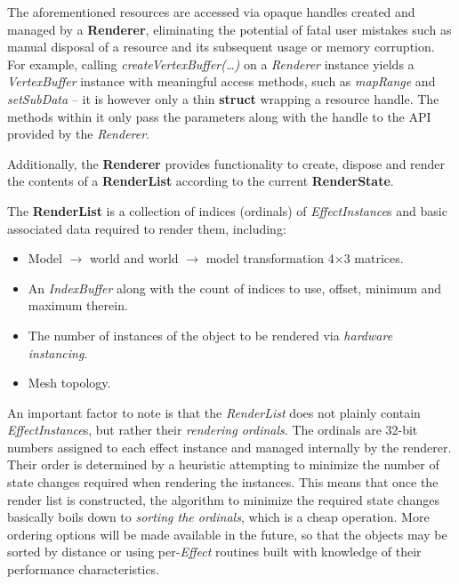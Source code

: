 The aforementioned resources are accessed via opaque handles created and managed by a \textbf{Renderer}, eliminating the potential of fatal user mistakes such as manual disposal of a resource and its subsequent usage or memory corruption. For example, calling \emph{createVertexBuffer(\ldots)} on a \emph{Renderer} instance yields a \emph{VertexBuffer} instance with meaningful access methods, such as \emph{mapRange} and \emph{setSubData} -- it is however only a thin \textbf{struct} wrapping a resource handle. The methods within it only pass the parameters along with the handle to the API provided by the \emph{Renderer}.

Additionally, the \textbf{Renderer} provides functionality to create, dispose and render the contents of a \textbf{RenderList} according to the current \textbf{RenderState}.

The \textbf{RenderList} is a collection of indices (ordinals) of \emph{EffectInstance}s and basic associated data required to render them, including:
	
\begin{itemize}
\item Model $\rightarrow$ world and world $\rightarrow$ model transformation 4×3 matrices.
\item An \emph{IndexBuffer} along with the count of indices to use, offset, minimum and maximum therein.
\item The number of instances of the object to be rendered via \emph{hardware instancing}.
\item Mesh topology.
\end{itemize}

An important factor to note is that the \emph{RenderList} does not plainly contain \emph{EffectInstance}s, but rather their \emph{rendering ordinals}. The ordinals are 32-bit numbers assigned to each effect instance and managed internally by the renderer. Their order is determined by a heuristic attempting to minimize the number of state changes required when rendering the instances. This means that once the render list is constructed, the algorithm to minimize the required state changes basically boils down to \emph{sorting the ordinals}, which is a cheap operation. More ordering options will be made available in the future, so that the objects may be sorted by distance or using per-\emph{Effect} routines built with knowledge of their performance characteristics.

